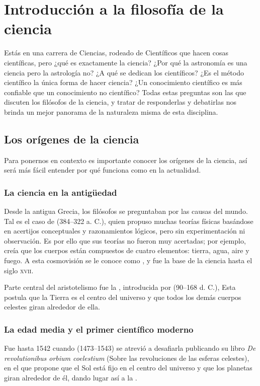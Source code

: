 \chapter{Introducción a la filosofía de la ciencia}
\label{cha:filosofiaciencia}

Estás en una carrera de Ciencias, rodeado de Científicos que hacen cosas
científicas, pero ¿qué es exactamente la ciencia?
¿Por qué la astronomía es una ciencia pero la astrología no?
¿A qué se dedican los científicos?
¿Es el método científico la única forma de hacer ciencia?
¿Un conocimiento científico es más confiable que un conocimiento no científico?
Todas estas preguntas son las que discuten los filósofos de la ciencia, y tratar
de responderlas y debatirlas nos brinda un mejor panorama de la naturaleza misma
de esta disciplina.

\section{Los orígenes de la ciencia}
\label{sec:losorigenesdelaciencia}

Para ponernos en contexto es importante conocer los orígenes de la ciencia, así
será más fácil entender por qué funciona como en la actualidad.

\subsection*{La ciencia en la antigüedad}
\label{sub:cienciaenlaantiguedad}
Desde la antigua Grecia, los filósofos se preguntaban por las causas del mundo.
Tal es el caso de  (384--322 a. C.), quien
propuso muchas teorías físicas basándose en acertijos conceptuales y
razonamientos lógicos, pero sin experimentación ni
observación\cite{sep-aristotle}.
Es por ello que sus teorías no fueron muy acertadas; por ejemplo, creía que los
cuerpos están compuestos de cuatro elementos: tierra, agua, aire y fuego.
A esta cosmovisión se le conoce como ,
y fue la base de la ciencia hasta el siglo \textsc{xvii}.

Parte central del aristotelismo fue la
, introducida por
 (90--168 d. C.), Esta postula que la Tierra es el
centro del universo y que todos los demás cuerpos celestes giran alrededor de
ella.

\subsection*{La edad media y el primer científico moderno}
\label{sub:laedadmediayelprimercientificomoderno}
Fue hasta 1542 cuando  (1473--1543)
se atrevió a desafiarla publicando su libro \textit{De revolutionibus
    orbium coelestium} (Sobre las revoluciones de las esferas celestes), en el
que propone que el Sol está fijo en el centro del universo y que los planetas
giran alrededor de él, dando lugar así a la
.

